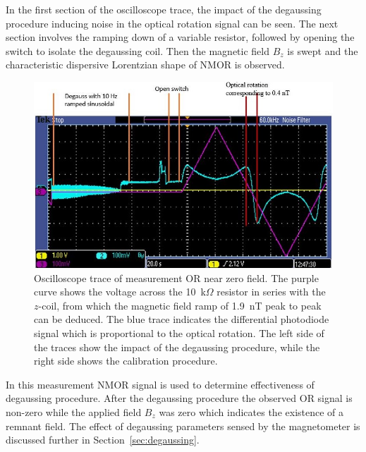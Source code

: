 In the first section of the oscilloscope trace, the impact of the
degaussing procedure inducing noise in the optical rotation signal can
be seen.  The next section involves the ramping down of a variable
resistor, followed by opening the switch to isolate the degaussing
coil.  Then the magnetic field $B_z$ is swept and the characteristic
dispersive Lorentzian shape of NMOR is observed.

\begin{figure}%
\centering\includegraphics[width=0.7\linewidth]{figures/scope_trace_of_field_sweeping}
\caption{Oscilloscope trace of measurement OR near zero field. The
  purple curve shows the voltage across the 10~k$\Omega$ resistor in
  series with the $z$-coil, from which the magnetic field ramp of
  1.9~nT peak to peak can be deduced.  The blue trace indicates the
  differential photodiode signal which is proportional to the optical
  rotation.  The left side of the traces show the impact of the
  degaussing procedure, while the right side shows the calibration
  procedure.\label{fig:TUNE} }
\end{figure}


In this measurement NMOR signal is used to determine effectiveness of
degaussing procedure. After the degaussing procedure the observed OR
signal is non-zero while the applied field $B_z$ was zero which
indicates the existence of a remnant field.  The effect of degaussing
parameters sensed by the magnetometer is discussed further in
Section~\ref{sec:degaussing}.



